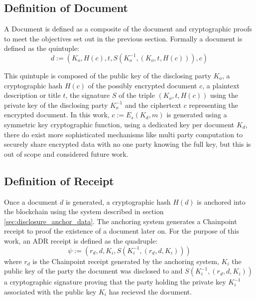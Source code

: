 \documentclass[12pt,msc,a4paper,oneside]{ucl_thesis}
\begin{document}
\subsection{Definition of Document} \label{sec:definition_of_document}
A Document is defined as a composite of the document and cryptographic proofs to meet the objectives set out in the previous section. Formally a document is defined as the quintuple:
\begin{equation}
    d := (K_o, H(c), t, S(K_o^{-1}, (K_o, t, H(c))), c) 
    \label{eq:disclosure_document}
\end{equation}

This quintuple is composed of the public key of the disclosing party $K_o$, a cryptographic hash $H(c)$ of the possibly encrypted document $c$, a plaintext description or title $t$, the signature $S$ of the triple $(K_o, t, H(c))$ using the private key of the disclosing party $K_o^{-1}$ and the ciphertext $c$ representing the encrypted document. In this work, $c := E_s(K_d, m)$ is generated using a symmetric key cryptographic function, using a dedicated key per document $K_d$, there do exist more sophisticated mechanisms like multi party computation to securely share encrypted data with no one party knowing the full key, but this is out of scope and considered future work.

\subsection{Definition of Receipt} \label{sec:definition_of_receipt}
Once a document $d$ is generated, a cryptographic hash $H(d)$ is anchored into the blockchain using the system described in section \ref{sec:disclosure_anchor_data}. The anchoring system generates a Chainpoint receipt to proof the existence of a document later on. For the purpose of this work, an ADR receipt is defined as the quadruple:
\begin{equation}
    \psi := (r_d, d, K_i, S(K_i^{-1}, (r_d, d, K_i)))
    \label{eq:disclosure_receipt}
\end{equation}
where $r_d$ is the Chainpoint receipt generated by the anchoring system, $K_i$ the public key of the party the document was disclosed to and $S(K_i^{-1}, (r_d, d, K_i))$ a cryptographic signature proving that the party holding the private key $K_i^{-1}$ associated with the public key $K_i$ has recieved the document.
\end{document}
